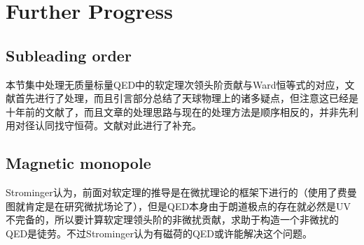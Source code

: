 \section{Further Progress}
\subsection{Subleading order}
本节集中处理无质量标量QED中的软定理次领头阶贡献与Ward恒等式的对应，文献\cite{Lysov:2014csa}首先进行了处理，而且引言部分总结了天球物理上的诸多疑点，但注意这已经是十年前的文献了，而且文章的处理思路与现在的处理方法是顺序相反的，并非先利用对径认同找守恒荷。文献\cite{Campiglia:2016hvg}对此进行了补充。
\subsection{Magnetic monopole}
Strominger认为，前面对软定理的推导是在微扰理论的框架下进行的（使用了费曼图就肯定是在研究微扰场论了），但是QED本身由于朗道极点的存在就必然是UV不完备的，所以要计算软定理领头阶的非微扰贡献，求助于构造一个非微扰的QED是徒劳。不过Strominger认为有磁荷的QED或许能解决这个问题\cite{Strominger:2015bla}。

